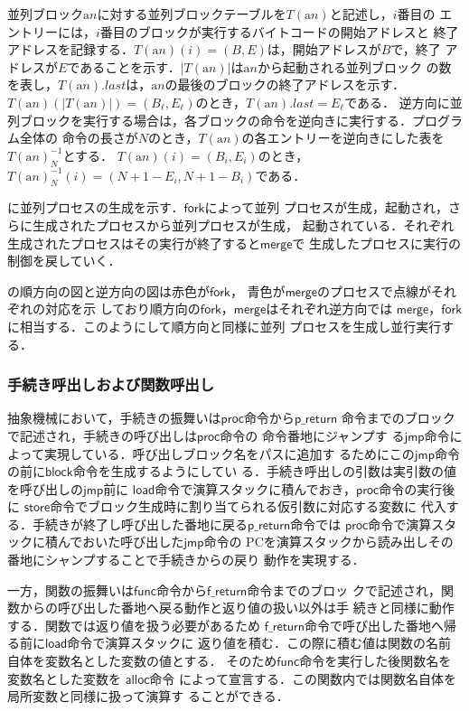 \documentclass[submit,PRO]{ipsj}
\newcommand{\bcode}[1]{$\mathsf{#1}$}
\newcommand{\alabel}[1]{\mathrm{a}#1}
\begin{document}
並列ブロック$\alabel{n}$に対する並列ブロックテーブルを$T(\alabel{n})$と記述し，$i$番目の
エントリーには，$i$番目のブロックが実行するバイトコードの開始アドレスと
終了アドレスを記録する．$T(\alabel{n})(i)=(B,E)$は，開始アドレスが$B$で，終了
アドレスが$E$であることを示す．$|T(\alabel{n})|$は$\alabel{n}$から起動される並列ブロック
の数を表し，$T(\alabel{n}).last$は，$\alabel{n}$の最後のブロックの終了アドレスを示す．
$T(\alabel{n})(|T(\alabel{n})|)=(B_\ell,E_\ell)$のとき，$T(\alabel{n}).last=E_\ell$である．
逆方向に並列ブロックを実行する場合は，各ブロックの命令を逆向きに実行する．プログラム全体の
命令の長さが$N$のとき，$T(\alabel{n})$の各エントリーを逆向きにした表を$T(\alabel{n})^{-1}_N$とする．
$T(\alabel{n})(i)=(B_i,E_i)$のとき，$T(\alabel{n})^{-1}_N(i)=(N+1-E_i,N+1-B_i)$である．

に並列プロセスの生成を示す．\bcode{fork}によって並列
プロセスが生成，起動され，さらに生成されたプロセスから並列プロセスが生成，
起動されている．それぞれ生成されたプロセスはその実行が終了すると\bcode{merge}で
生成したプロセスに実行の制御を戻していく．

の順方向の図と逆方向の図は赤色が\bcode{fork}，
青色が\bcode{merge}のプロセスで点線がそれぞれの対応を示
しており順方向の\bcode{fork}，\bcode{merge}はそれぞれ逆方向では
\bcode{merge}，\bcode{fork}に相当する．このようにして順方向と同様に並列
プロセスを生成し並行実行する．

\subsubsection{手続き呼出しおよび関数呼出し}

抽象機械において，手続きの振舞いは\bcode{proc}命令から\bcode{p\_return}
命令までのブロックで記述され，手続きの呼び出しは\bcode{proc}命令の
命令番地にジャンプす
る\bcode{jmp}命令によって実現している．呼び出しブロック名をパスに追加す
るためにこの\bcode{jmp}命令の前に\bcode{block}命令を生成するようにしてい
る．手続き呼出しの引数は実引数の値を呼び出しの\bcode{jmp}前に
\bcode{load}命令で演算スタックに積んでおき，\bcode{proc}命令の実行後に
\bcode{store}命令でブロック生成時に割り当てられる仮引数に対応する変数に
代入する．手続きが終了し呼び出した番地に戻る\bcode{p\_return}命令では
\bcode{proc}命令で演算スタックに積んでおいた呼び出した\bcode{jmp}命令の
PCを演算スタックから読み出しその番地にシャンプすることで手続きからの戻り
動作を実現する．

一方，関数の振舞いは\bcode{func}命令から\bcode{f\_return}命令までのブロッ
クで記述され，関数からの呼び出した番地へ戻る動作と返り値の扱い以外は手
続きと同様に動作する．関数では返り値を扱う必要があるため
\bcode{f\_return}命令で呼び出した番地へ帰る前に\bcode{load}命令で演算スタックに
返り値を積む．この際に積む値は関数の名前自体を変数名とした変数の値とする．
そのため\bcode{func}命令を実行した後関数名を変数名とした変数を
\bcode{alloc}命令
によって宣言する．この関数内では関数名自体を局所変数と同様に扱って演算す
ることができる．
\end{document}
